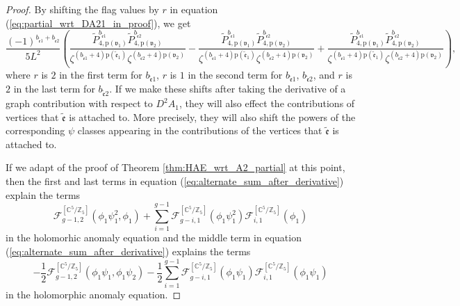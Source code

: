 \documentclass[12pt]{amsart}
\numberwithin{equation}{section}
\begin{document}
\begin{proof}
By shifting the flag values by $r$ in equation (\ref{eq:partial_wrt_DA21_in_proof}), we get
\begin{equation}\label{eq:alternate_sum_after_derivative}
\frac{(-1)^{b_{\tilde{\mathfrak{e}}1}+b_{\tilde{\mathfrak{e}}2}}}{5L^2}\left(
    \frac{\widetilde{P}_{4,\mathrm{p}(\mathfrak{v}_1)}^{b_{\tilde{\mathfrak{e}}1}}\widetilde{P}_{4,\mathrm{p}(\mathfrak{v}_2)}^{b_{\tilde{\mathfrak{e}}2}}}{\zeta^{(b_{\tilde{\mathfrak{e}}1}+4)\mathrm{p}(\tilde{\mathfrak{e}}_1)}\zeta^{(b_{\tilde{\mathfrak{e}}2}+4)\mathrm{p}(\mathfrak{v}_2)}}
    -\frac{\widetilde{P}_{4,\mathrm{p}(\mathfrak{v}_1)}^{b_{\tilde{\mathfrak{e}}1}}\widetilde{P}_{4,\mathrm{p}(\mathfrak{v}_2)}^{b_{\tilde{\mathfrak{e}}2}}}{\zeta^{(b_{\tilde{\mathfrak{e}}1}+4)\mathrm{p}(\tilde{\mathfrak{e}}_1)}\zeta^{(b_{\tilde{\mathfrak{e}}2}+4)\mathrm{p}(\mathfrak{v}_2)}}
    +\frac{\widetilde{P}_{4,\mathrm{p}(\mathfrak{v}_1)}^{b_{\tilde{\mathfrak{e}}1}}\widetilde{P}_{4,\mathrm{p}(\mathfrak{v}_2)}^{b_{\tilde{\mathfrak{e}}2}}}{\zeta^{(b_{\tilde{\mathfrak{e}}1}+4)\mathrm{p}(\tilde{\mathfrak{e}}_1)}\zeta^{(b_{\tilde{\mathfrak{e}}2}+4)\mathrm{p}(\mathfrak{v}_2)}}
    \right),
\end{equation}
where $r$ is $2$ in the first term for $b_{\tilde{\mathfrak{e}}1}$, $r$ is $1$ in the second term for $b_{\tilde{\mathfrak{e}}1}$, $b_{\tilde{\mathfrak{e}}2}$, and $r$ is $2$ in the last term for $b_{\tilde{\mathfrak{e}}2}$. If we make these shifts after taking the derivative of a graph contribution with respect to $D^2A_1$, they will also effect the contributions of vertices that $\tilde{\mathfrak{e}}$ is attached to. More precisely, they will also shift the powers of the corresponding $\psi$ classes appearing in the contributions of the vertices that $\tilde{\mathfrak{e}}$ is attached to.

If we adapt of the proof of Theorem \ref{thm:HAE_wrt_A2_partial} at this point, then the first and last terms in equation (\ref{eq:alternate_sum_after_derivative}) explain the terms
$$\mathcal{F}_{g-1,2}^{\left[\mathbb{C}^5 / \mathbb{Z}_5\right]}\left(\phi_1\psi_1^2,\phi_1\right)+\sum_{i=1}^{g-1}\mathcal{F}_{g-i,1}^{\left[\mathbb{C}^5 / \mathbb{Z}_5\right]}\left(\phi_1\psi_1^2\right)\mathcal{F}_{i,1}^{\left[\mathbb{C}^5 / \mathbb{Z}_5\right]}\left(\phi_1\right)$$
in the holomorhic anomaly equation and the middle term in equation (\ref{eq:alternate_sum_after_derivative}) explains
the terms
$$-\frac{1}{2}\mathcal{F}_{g-1,2}^{\left[\mathbb{C}^5 / \mathbb{Z}_5\right]}\left(\phi_1\psi_1,\phi_1\psi_2\right) -\frac{1}{2}\sum_{i=1}^{g-1}\mathcal{F}_{g-i,1}^{\left[\mathbb{C}^5 / \mathbb{Z}_5\right]}\left(\phi_1\psi_1\right)\mathcal{F}_{i,1}^{\left[\mathbb{C}^5 / \mathbb{Z}_5\right]}\left(\phi_1\psi_1\right)$$
in the holomorphic anomaly equation.
\end{proof}
\end{document}
